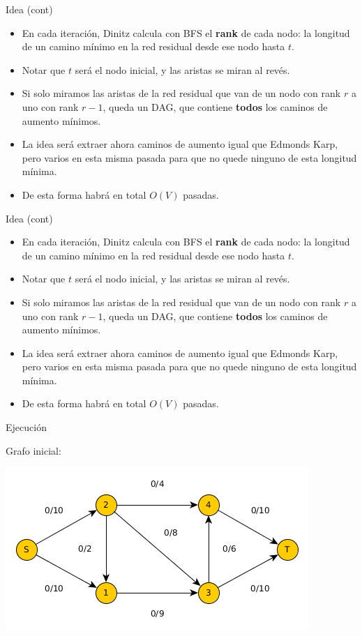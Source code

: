 \documentclass{beamer}
\begin{document}
\begin{frame}{Idea (cont)}
    \begin{itemize}
        \item En cada iteración, Dinitz calcula con BFS el \textbf{rank} de cada nodo: la longitud de un camino mínimo en la red residual desde ese nodo hasta $t$.
        \item Notar que $t$ será el nodo inicial, y las aristas se miran al revés.
        \item Si solo miramos las aristas de la red residual que van de un nodo con rank $r$ a uno con rank $r-1$, queda un DAG, que contiene \textbf{todos} los caminos de aumento mínimos.
        \item La idea será extraer ahora caminos de aumento igual que Edmonds Karp, pero varios en esta misma pasada para que no quede ninguno de esta longitud mínima.
        \item De esta forma habrá en total $O(V)$ pasadas.
    \end{itemize}
\end{frame}

\begin{frame}{Idea (cont)}
    \begin{itemize}
        \item En cada iteración, Dinitz calcula con BFS el \textbf{rank} de cada nodo: la longitud de un camino mínimo en la red residual desde ese nodo hasta $t$.
        \item Notar que $t$ será el nodo inicial, y las aristas se miran al revés.
        \item Si solo miramos las aristas de la red residual que van de un nodo con rank $r$ a uno con rank $r-1$, queda un DAG, que contiene \textbf{todos} los caminos de aumento mínimos.
        \item La idea será extraer ahora caminos de aumento igual que Edmonds Karp, pero varios en esta misma pasada para que no quede ninguno de esta longitud mínima.
        \item De esta forma habrá en total $O(V)$ pasadas.
    \end{itemize}
\end{frame}

\begin{frame}{Ejecución}

    Grafo inicial:
    
    \includegraphics[scale=0.6]{dinitz/dinitz1.png}
    
\end{frame}
\end{document}
